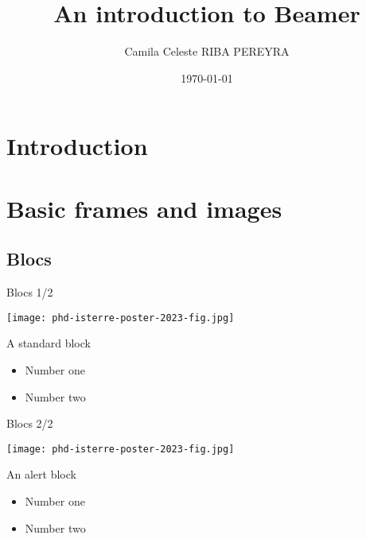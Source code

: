 \documentclass[11pt]{beamer}
\author{Camila Celeste RIBA PEREYRA}
\title{An introduction to Beamer}
\institute{ISTerre - USMB}
\date{\today}
\begin{document}
\section{Introduction}
\begin{frame}[plain]
	\titlepage
\end{frame}

\begin{frame}
\tableofcontents
\end{frame}


\section{Basic frames and images}
\subsection{Blocs}
\begin{frame}{Blocs 1/2}
	\begin{center}
		\texttt{[image: phd-isterre-poster-2023-fig.jpg]}
	\end{center}
	\begin{block} {A standard block}
		\begin{itemize}
			\item Number one
			\item Number two
		\end{itemize}
	\end{block}
\end{frame}

\begin{frame}{Blocs 2/2}
	\begin{center}
		\texttt{[image: phd-isterre-poster-2023-fig.jpg]}
	\end{center}
	\begin{alertblock} {An alert block}
		\begin{itemize}
			\item Number one
			\item Number two
		\end{itemize}
	\end{alertblock}
\end{frame}
\end{document}
